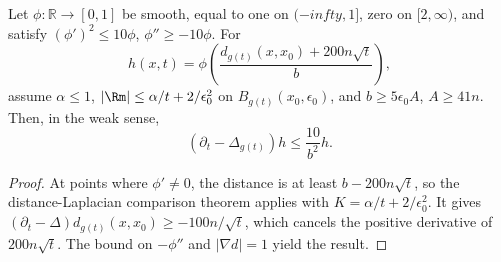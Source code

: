 \begin{lemma}
\label{lem:chow-iii-time-dependent-cutoff}
Let \(\phi\colon\mathbb R\to[0,1]\) be smooth, equal to one on
\((-infty,1]\), zero on \([2,\infty)\), and satisfy
\((\phi')^2\le10\phi\), \(\phi''\ge-10\phi\).  For
\[
 h(x,t)=\phi\!\left(\frac{d_{g(t)}(x,x_0)+200n\sqrt t}{b}\right),
\]
assume \(\alpha\le1\), \(|\Rm|\le\alpha/t+2/\epsilon_0^2\) on
\(B_{g(t)}(x_0,\epsilon_0)\), and \(b\ge5\epsilon_0A\), \(A\ge41n\).  Then,
in the weak sense,
\[
 (\partial_t-\Delta_{g(t)})h\le\frac{10}{b^2}h.
\]
\end{lemma}
\begin{proof}
\sketch At points where \(\phi'\ne0\), the distance is at least \(b-200n\sqrt t\),
so the distance-Laplacian comparison theorem applies with
\(K=\alpha/t+2/\epsilon_0^2\).  It gives
\((\partial_t-\Delta)d_{g(t)}(x,x_0)\ge-100n/\sqrt t\), which cancels the
positive derivative of \(200n\sqrt t\).  The bound on \(-\phi''\) and
\(|\nabla d|=1\) yield the result.
\end{proof}

